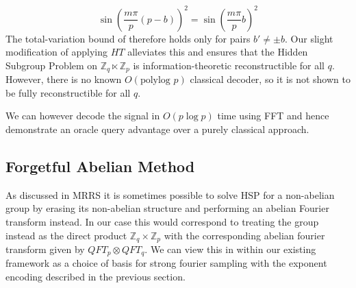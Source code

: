 \documentclass[aps,floatfix,10pt,amssymb,amsfont,amsmath,superscriptaddress,float,nofootinbib,longbibliography,nobalancelastpage,twocolumn]{revtex4-2}
\begin{document}
\begin{equation}
    \sin \left( \frac{m\pi}{p}(p-b)\right)^2 =\sin \left(\frac{m\pi}{p}b\right)^2
\end{equation}
The total-variation bound of \cite{moore2007power} therefore holds only for pairs $b' \neq \pm b$. Our slight modification of applying $HT$ alleviates this and ensures that the Hidden Subgroup Problem on $\mathbb{Z}_q \ltimes \mathbb{Z}_p$ is information-theoretic reconstructible for all $q$. However, there is no known $O(\text{polylog } p)$ classical decoder, so it is not shown to be fully reconstructible for all $q$.

We can however decode the signal in $O(p \log p)$ time using FFT and hence demonstrate an oracle query advantage over a purely classical approach.

\subsection{Forgetful Abelian Method}
\label{section:forgetful}
As discussed in MRRS it is sometimes possible to solve HSP for a non-abelian group by erasing its non-abelian structure and performing an abelian Fourier transform instead. In our case this would correspond to treating the group instead as the direct product $\mathbb{Z}_q \times \mathbb{Z}_p$ with the corresponding abelian fourier transform given by $QFT_p \otimes QFT_q$. We can view this in within our existing framework as a choice of basis for strong fourier sampling with the exponent encoding described in the previous section.
\end{document}
